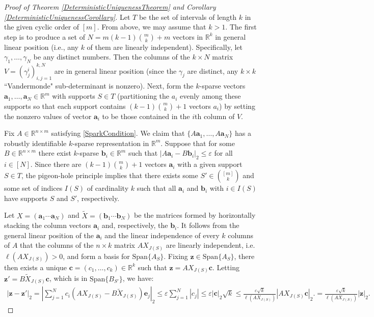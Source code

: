 \documentclass[journal, onecolumn]{IEEEtran}
\begin{document}
\begin{proof}[Proof of Theorem \ref{DeterministicUniquenessTheorem} and Corollary \ref{DeterministicUniquenessCorollary}]
Let $T$ be the set of intervals of length $k$ in the given cyclic order of $[m]$.  From above, we may assume that $k > 1$. The first step is to produce a set of $N = m(k-1){m \choose k}+m$ vectors in $\mathbb{R}^k$ in general linear position (i.e., any $k$ of them are linearly independent). Specifically, let $\gamma_1, \ldots, \gamma_N$ be any distinct numbers. Then the columns of the $k \times N$ matrix $V = (\gamma^i_j)^{k,N}_{i,j=1}$ are in general linear position (since the $\gamma_j$ are distinct, any $k \times k$ ``Vandermonde" sub-determinant is nonzero). Next, form the $k$-sparse vectors $\mathbf{a}_1, \ldots, \mathbf{a}_N \in \mathbb{R}^m$ with supports $S \in T$ (partitioning the $a_i$ evenly among these supports so that each support contains $(k-1){m \choose k}+1$ vectors $a_i$) by setting the nonzero values of vector $\mathbf{a}_i$ to be those contained in the $i$th column of $V$.

Fix $A \in \mathbb{R}^{n \times m}$ satisfying \eqref{SparkCondition}. We claim that $\{A\mathbf{a}_1, \ldots, A\mathbf{a}_N\}$ has a robustly identifiable $k$-sparse representation in $\mathbb{R}^m$. Suppose that for some $B \in \mathbb{R}^{n \times m}$ there exist $k$-sparse $\mathbf{b}_i \in \mathbb{R}^m$ such that $|A\mathbf{a}_i - B\mathbf{b}_i|_2 \leq \varepsilon$ for all $i \in [N]$. Since there are $(k-1){m \choose k}+1$ vectors $\mathbf{a}_i$ with a given support $S \in T$, the pigeon-hole principle implies that there exists some $S' \in {[m] \choose k}$ and some set of indices $I(S)$ of cardinality $k$ such that all $\mathbf{a}_i$ and $\mathbf{b}_i$ with $i \in I(S)$ have supports $S$ and $S'$, respectively.

Let $X = (\mathbf{a}_1 \cdots \mathbf{a}_N)$ and $\tilde{X} = (\mathbf{b}_1 \cdots \mathbf{b}_N)$ be the matrices formed by horizontally stacking the column vectors $\mathbf{a}_i$ and, respectively, the $\mathbf{b}_i$. It follows from the general linear position of the $\mathbf{a}_i$ and the linear independence of every $k$ columns of $A$ that the columns of the $n \times k$ matrix $AX_{J(S)}$ are linearly independent, i.e. $\ell(AX_{J(S)}) > 0$, and form a basis for $\text{Span}\{A_{S}\}$. Fixing $\mathbf{z} \in \text{Span}\{A_{S}\}$, there then exists a unique $\mathbf{c} = (c_1, \ldots, c_k) \in \mathbb{R}^k$ such that $\mathbf{z} = AX_{J(S)}\mathbf{c}$. Letting $\mathbf{z'} = B\tilde{X}_{J(S)}\mathbf{c}$, which is in $\text{Span}\{B_{S'}\}$, we have:
\begin{align*}
|\mathbf{z} - \mathbf{z'}|_2 = |\sum_{j=1}^N c_i(AX_{J(S)} - B\tilde{X}_{J(S)})\mathbf{e}_j|_2 
\leq \varepsilon \sum_{j=1}^N |c_j| 
\leq \varepsilon |\mathbf{c}|_2 \sqrt{k}  
\leq \frac{\varepsilon \sqrt{k}}{\ell(AX_{J(S)})} |AX_{J(S)}\mathbf{c}|_2.
= \frac{\varepsilon \sqrt{k}}{\ell(AX_{J(S)})} |\mathbf{z}|_2.
\end{align*}


\end{proof}
\end{document}
